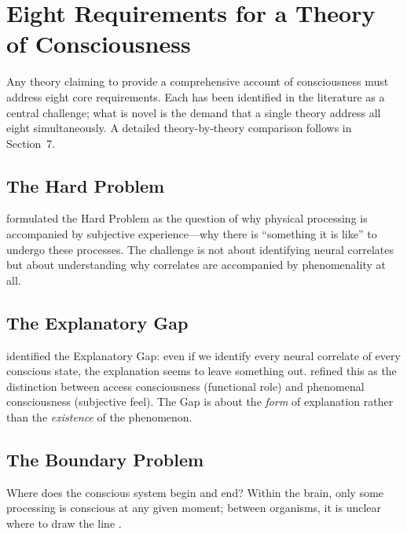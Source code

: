 \documentclass[12pt]{article}
\begin{document}
\section{Eight Requirements for a Theory of Consciousness}

Any theory claiming to provide a comprehensive account of consciousness must address eight core requirements. Each has been identified in the literature as a central challenge; what is novel is the demand that a single theory address all eight simultaneously. A detailed theory-by-theory comparison follows in Section~7.


\subsection{The Hard Problem}

\citet{Chalmers1995,Chalmers1996} formulated the Hard Problem as the question of why physical processing is accompanied by subjective experience---\hspace{0pt}why there is ``something it is like'' \citep{Nagel1974} to undergo these processes. The challenge is not about identifying neural correlates but about understanding why correlates are accompanied by phenomenality at all.


\subsection{The Explanatory Gap}

\citet{Levine1983} identified the Explanatory Gap: even if we identify every neural correlate of every conscious state, the explanation seems to leave something out. \citet{Block1995,Block2007} refined this as the distinction between access consciousness (functional role) and phenomenal consciousness (subjective feel). The Gap is about the \emph{form} of explanation rather than the \emph{existence} of the phenomenon.


\subsection{The Boundary Problem}

Where does the conscious system begin and end? Within the brain, only some processing is conscious at any given moment; between organisms, it is unclear where to draw the line \citep{Bayne2010,Tononi2004,Friston2010,Bruineberg2022}.
\end{document}

